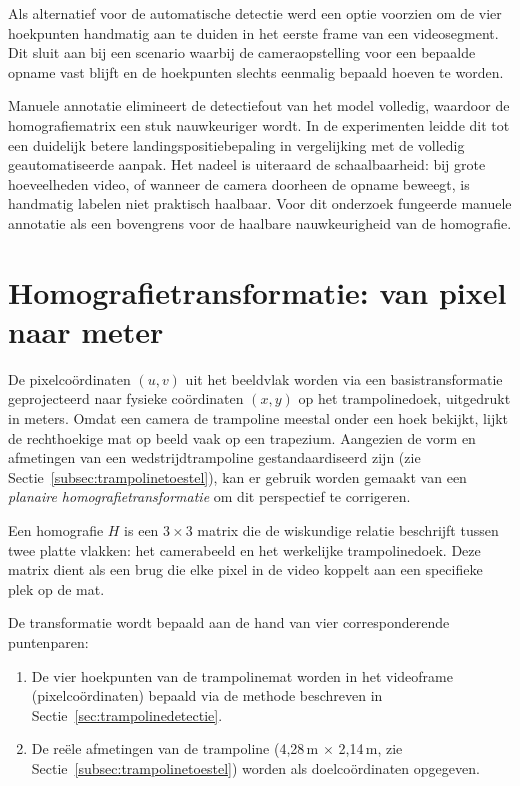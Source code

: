 Als alternatief voor de automatische detectie werd een optie voorzien om de vier hoekpunten handmatig aan te duiden in het eerste frame van een videosegment. Dit sluit aan bij een scenario waarbij de cameraopstelling voor een bepaalde opname vast blijft en de hoekpunten slechts eenmalig bepaald hoeven te worden.

Manuele annotatie elimineert de detectiefout van het model volledig, waardoor de homografiematrix een stuk nauwkeuriger wordt. In de experimenten leidde dit tot een duidelijk betere landingspositiebepaling in vergelijking met de volledig geautomatiseerde aanpak. Het nadeel is uiteraard de schaalbaarheid: bij grote hoeveelheden video, of wanneer de camera doorheen de opname beweegt, is handmatig labelen niet praktisch haalbaar. Voor dit onderzoek fungeerde manuele annotatie als een bovengrens voor de haalbare nauwkeurigheid van de homografie.


\section{Homografietransformatie: van pixel naar meter}
\label{sec:homografie}

De pixelco{\"o}rdinaten $(u, v)$ uit het beeldvlak worden via een basistransformatie geprojecteerd naar fysieke co{\"o}rdinaten $(x, y)$ op het trampolinedoek, uitgedrukt in meters. Omdat een camera de trampoline meestal onder een hoek bekijkt, lijkt de rechthoekige mat op beeld vaak op een trapezium. Aangezien de vorm en afmetingen van een wedstrijdtrampoline gestandaardiseerd zijn (zie Sectie~\ref{subsec:trampolinetoestel}), kan er gebruik worden gemaakt van een \textit{planaire homografietransformatie} om dit perspectief te corrigeren.

Een homografie $H$ is een $3 \times 3$ matrix die de wiskundige relatie beschrijft tussen twee platte vlakken: het camerabeeld en het werkelijke trampolinedoek. Deze matrix dient als een brug die elke pixel in de video koppelt aan een specifieke plek op de mat.

De transformatie wordt bepaald aan de hand van vier corresponderende puntenparen:
\begin{enumerate}
    \item De vier hoekpunten van de trampolinemat worden in het videoframe (pixelco{\"o}rdinaten) bepaald via de methode beschreven in Sectie~\ref{sec:trampolinedetectie}.
    \item De re{\"e}le afmetingen van de trampoline (4,28\,m $\times$ 2,14\,m, zie Sectie~\ref{subsec:trampolinetoestel}) worden als doelco{\"o}rdinaten opgegeven.
\end{enumerate}

